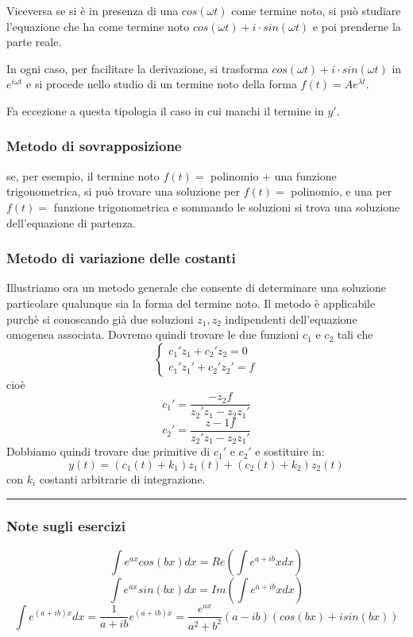 \begin{itemize}
    Viceversa se si è in presenza di una $cos(\omega t)$ come termine noto, si può studiare l'equazione che ha come termine noto $cos(\omega t) + i \cdot sin(\omega t)$ e poi prenderne la parte reale.\newline
    \begin{tcolorbox}
        In ogni caso, per facilitare la derivazione, si trasforma $cos(\omega t) + i \cdot sin(\omega t)$ in $e^{i\omega t}$ e si procede nello studio di un termine noto della forma $f(t) = Ae^{\lambda t}$.
    \end{tcolorbox}
    Fa eccezione a questa tipologia il caso in cui manchi il termine in $y'$.\newline
    \newline
\end{itemize}
\subsubsection*{Metodo di sovrapposizione}
\begin{tcolorbox}
se, per esempio, il termine noto $f(t) =$ polinomio $+$ una funzione trigonometrica, si può trovare una soluzione per $f(t) =$ polinomio, e una per $f(t) =$ funzione trigonometrica e sommando le soluzioni si trova una soluzione dell'equazione di partenza.
\end{tcolorbox}
\subsubsection*{Metodo di variazione delle costanti}
Illustriamo ora un metodo generale che consente di determinare una soluzione particolare qualunque sia la forma del termine noto.\newline
Il metodo è applicabile purchè si conoscando già due soluzioni $z_1, z_2$ indipendenti dell'equazione omogenea associata.\newline
Dovremo quindi trovare le due funzioni $c_1$ e $c_2$ tali che
\[
    \begin{cases}
        c_1'z_1 + c_2'z_2 = 0 \\
        c_1'z_1' + c_2' z_2' = f
    \end{cases}
\]
cioè
\[
    c_1' = \frac{-z_2 f}{z_2'z_1 - z_2 z_1'}
\]
\[
    c_2' = \frac{z-1 f}{z_2'z_1 - z_2 z_1'}
\]
Dobbiamo quindi trovare due primitive di $c_1'$ e $c_2'$ e sostituire in:
\[
    y(t) =(c_1(t)+ k_1)z_1(t) + (c_2(t)+k_2)z_2(t)
\]
con $k_i$ costanti arbitrarie di integrazione.\newline
\rule{\textwidth}{0,4pt}
\subsubsection*{Note sugli esercizi}
\[
    \int e^{ax}cos(bx) dx = Re (\int e^{a+ib}x dx ) 
\]
\[
    \int e^{ax}sin(bx) dx = Im (\int e^{a+ib}x dx ) 
\]
\[
    \int e^{(a+ib)x} dx = \frac{1}{a+ib}e^{(a+ib)x} = \frac{e^{ax}}{a^2+b^2} (a-ib)(cos(bx) + i sin(bx))
\]
